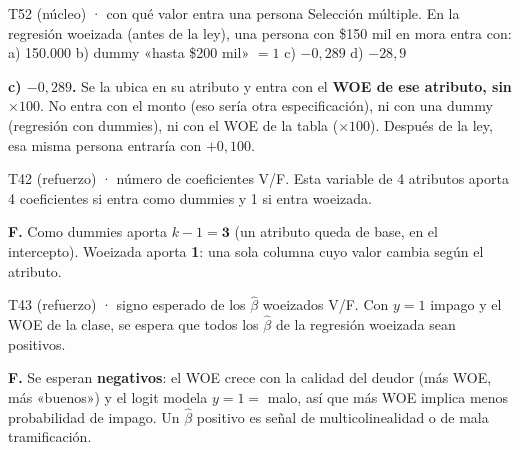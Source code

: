 \documentclass[10pt,a4paper]{article}
\begin{document}
\begin{enun}{T52 (núcleo) · con qué valor entra una persona}
Selección múltiple. En la regresión woeizada (antes de la ley), una persona con \$150 mil en mora entra con: a) 150.000 \quad b) dummy «hasta \$200 mil» $=1$ \quad c) $-0{,}289$ \quad d) $-28{,}9$
\end{enun}
\begin{ejemplar}
\textbf{c) $-0{,}289$.} Se la ubica en su atributo y entra con el \textbf{WOE de ese atributo, sin $\times100$}. No entra con el monto (eso sería otra especificación), ni con una dummy (regresión con dummies), ni con el WOE de la tabla ($\times100$). Después de la ley, esa misma persona entraría con $+0{,}100$.
\end{ejemplar}

\begin{enun}{T42 (refuerzo) · número de coeficientes}
V/F. Esta variable de 4 atributos aporta 4 coeficientes si entra como dummies y 1 si entra woeizada.
\end{enun}
\begin{ejemplar}
\textbf{F.} Como dummies aporta $k-1=\mathbf{3}$ (un atributo queda de base, en el intercepto). Woeizada aporta \textbf{1}: una sola columna cuyo valor cambia según el atributo.
\end{ejemplar}

\begin{enun}{T43 (refuerzo) · signo esperado de los $\hat\beta$ woeizados}
V/F. Con $y=1$ impago y el WOE de la clase, se espera que todos los $\hat\beta$ de la regresión woeizada sean positivos.
\end{enun}
\begin{ejemplar}
\textbf{F.} Se esperan \textbf{negativos}: el WOE crece con la calidad del deudor (más WOE, más «buenos») y el logit modela $y=1=$ malo, así que más WOE implica menos probabilidad de impago. Un $\hat\beta$ positivo es señal de multicolinealidad o de mala tramificación.
\end{ejemplar}
\end{document}
